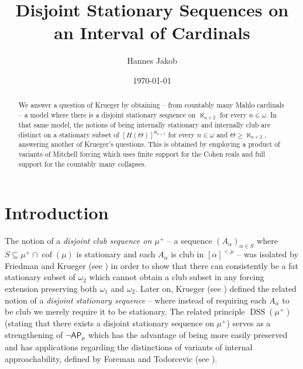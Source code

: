 \documentclass[12pt]{amsart}
\title{Disjoint Stationary Sequences on an Interval of Cardinals} %
\author[H. Jakob]{Hannes Jakob} %
\date{\today}
\theoremstyle{definition}
\theoremstyle{remark}
\theoremstyle{plain}
\numberwithin{mydef}{section}
\DeclareMathOperator{\cof}{cof}
\DeclareMathOperator{\DSS}{DSS}
\newcommand{\AP}{\mathsf{AP}}
\begin{document}
	
	
	\baselineskip=17pt
	
	
	
	\begin{abstract}
		We answer a question of Krueger by obtaining -- from countably many Mahlo cardinals -- a model where there is a disjoint stationary sequence on $\aleph_{n+2}$ for every $n\in\omega$. In that same model, the notions of being internally stationary and internally club are distinct on a stationary subset of $[H(\Theta)]^{\aleph_{n+1}}$ for every $n\in\omega$ and $\Theta\geq\aleph_{n+2}$, answering another of Krueger's questions. This is obtained by employing a product of variants of Mitchell forcing which uses finite support for the Cohen reals and full support for the countably many collapses.
	\end{abstract}
	
	\maketitle
	
	\section{Introduction}
	
	The notion of a \emph{disjoint club sequence on $\mu^+$} -- a sequence $(A_{\alpha})_{\alpha\in S}$ where $S\subseteq\mu^+\cap\cof(\mu)$ is stationary and each $A_{\alpha}$ is club in $[\alpha]^{<\mu}$ -- was isolated by Friedman and Krueger (see \cite{FriedmanKruegerThinDisjoint}) in order to show that there can consistently be a fat stationary subset of $\omega_2$ which cannot obtain a club subset in any forcing extension preserving both $\omega_1$ and $\omega_2$. Later on, Krueger (see \cite{KruegerApplicMSI}) defined the related notion of a \emph{disjoint stationary sequence} -- where instead of requiring each $A_{\alpha}$ to be club we merely require it to be stationary. The related principle $\DSS(\mu^+)$ (stating that there exists a disjoint stationary sequence on $\mu^+$) serves as a strengthening of $\neg\AP_{\mu}$ which has the advantage of being more easily preserved and has applications regarding the distinctions of variants of internal approachability, defined by Foreman and Todorcevic (see \cite{ForemanTodorLowenheimSkolem}).
	
\end{document}

